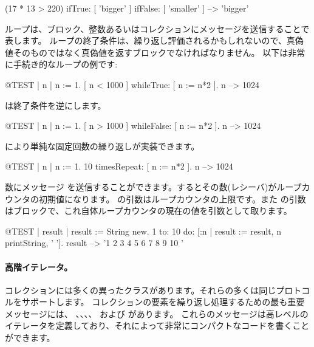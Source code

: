 \documentclass[a4paper,10pt,twoside]{book}
\begin{document}
\begin{code}{}
(17 * 13 > 220)
   ifTrue: [ 'bigger' ]
   ifFalse: [ 'smaller' ] --> 'bigger'
\end{code}

ループは、ブロック、整数あるいはコレクションにメッセージを送信することで表します。
ループの終了条件は、繰り返し評価されるかもしれないので、真偽値そのものではなく真偽値を返すブロックでなければなりません。
以下は非常に手続き的なループの例です:

\begin{code}{@TEST | n |}
n := 1.
[ n < 1000 ] whileTrue: [ n := n*2 ].
n --> 1024
\end{code}

\noindent
{} は終了条件を逆にします。
\begin{code}{@TEST | n |}
n := 1.
[ n > 1000 ] whileFalse: [ n := n*2 ].
n --> 1024
\end{code}

\noindent
{} により単純な固定回数の繰り返しが実装できます。

\begin{code}{@TEST | n |}
n := 1.
10 timesRepeat: [ n := n*2 ].
n --> 1024
\end{code}

数にメッセージ  を送信することができます。するとその数(レシーバ)がループカウンタの初期値になります。
 の引数はループカウンタの上限です。また  の引数はブロックで、これ自体ループカウンタの現在の値を引数として取ります。

\begin{code}{@TEST | result |}
result := String new.
1 to: 10 do: [:n | result := result, n printString, ' '].
result --> '1 2 3 4 5 6 7 8 9 10 '
\end{code}


\paragraph{高階イテレータ。}
コレクションには多くの異ったクラスがあります。それらの多くは同じプロトコルをサポートします。
コレクションの要素を繰り返し処理するための最も重要メッセージには、
、、、、 および  があります。
これらのメッセージは高レベルのイテレータを定義しており、それによって非常にコンパクトなコードを書くことができます。
\end{document}
